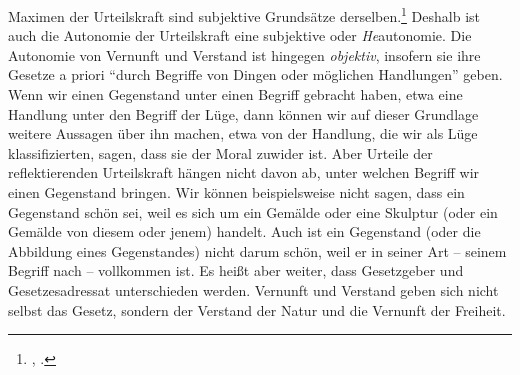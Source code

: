 \begin{nummerierung}
Maximen der Urteilskraft sind subjektive Grundsätze
derselben.\footnote{\cite[Vgl.][B xxxiv]{Kant:KritikderUrteilskraft2009},
\cite[][V: 184.10--16]{Kant:GesammelteWerke1900ff.}.} Deshalb ist auch die
Autonomie der Urteilskraft eine subjektive oder \emph{He}autonomie. Die
Autonomie von Vernunft und Verstand ist hingegen \emph{objektiv}, insofern sie
ihre Gesetze a priori \enquote{durch Begriffe von Dingen oder möglichen
Handlungen} geben. Wenn wir einen Gegenstand unter einen Begriff gebracht haben,
etwa eine Handlung unter den Begriff der Lüge, dann können wir auf dieser
Grundlage weitere Aussagen über ihn machen, etwa von der Handlung, die wir als
Lüge klassifizierten, sagen, dass sie der Moral zuwider ist. Aber Urteile der
reflektierenden Urteilskraft hängen nicht davon ab, unter welchen Begriff wir
einen Gegenstand bringen. Wir können beispielsweise nicht sagen, dass ein
Gegenstand schön sei, weil es sich um ein Gemälde oder eine Skulptur (oder ein
Gemälde von diesem oder jenem) handelt. Auch ist ein Gegenstand (oder die
Abbildung eines Gegenstandes) nicht darum schön, weil er in seiner Art -- seinem
Begriff nach -- vollkommen ist. Es heißt aber weiter, dass Gesetzgeber und
Gesetzesadressat unterschieden werden. Vernunft und Verstand geben sich nicht
selbst das Gesetz, sondern der Verstand der Natur und die Vernunft der Freiheit.


\end{nummerierung}
